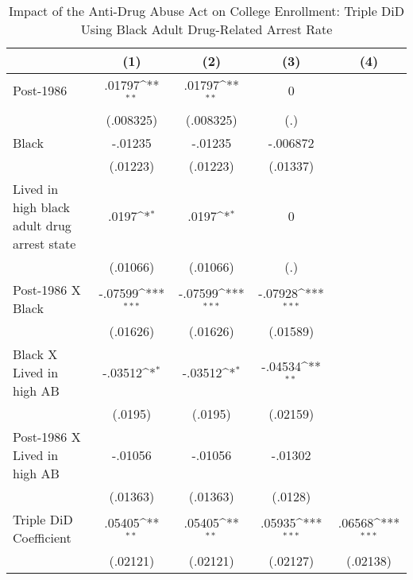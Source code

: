 \begin{table}[htbp]\centering
\def\sym#1{\ifmmode^{#1}\else\(^{#1}\)\fi}
\caption{Impact of the Anti-Drug Abuse Act on College Enrollment: Triple DiD Using Black Adult Drug-Related Arrest Rate}
\begin{tabular}{l*{4}{c}}
\hline\hline
                    &\multicolumn{1}{c}{(1)}         &\multicolumn{1}{c}{(2)}         &\multicolumn{1}{c}{(3)}         &\multicolumn{1}{c}{(4)}         \\
\hline
Post-1986           &      .01797\sym{**} &      .01797\sym{**} &           0         &                     \\
                    &   (.008325)         &   (.008325)         &         (.)         &                     \\
[1em]
Black               &     -.01235         &     -.01235         &    -.006872         &                     \\
                    &    (.01223)         &    (.01223)         &    (.01337)         &                     \\
[1em]
Lived in high black adult drug arrest state&       .0197\sym{*}  &       .0197\sym{*}  &           0         &                     \\
                    &    (.01066)         &    (.01066)         &         (.)         &                     \\
[1em]
Post-1986 X Black   &     -.07599\sym{***}&     -.07599\sym{***}&     -.07928\sym{***}&                     \\
                    &    (.01626)         &    (.01626)         &    (.01589)         &                     \\
[1em]
Black X Lived in high AB&     -.03512\sym{*}  &     -.03512\sym{*}  &     -.04534\sym{**} &                     \\
                    &     (.0195)         &     (.0195)         &    (.02159)         &                     \\
[1em]
Post-1986 X Lived in high AB&     -.01056         &     -.01056         &     -.01302         &                     \\
                    &    (.01363)         &    (.01363)         &     (.0128)         &                     \\
[1em]
Triple DiD Coefficient&      .05405\sym{**} &      .05405\sym{**} &      .05935\sym{***}&      .06568\sym{***}\\
                    &    (.02121)         &    (.02121)         &    (.02127)         &    (.02138)         \\

\end{tabular}
\end{table}
